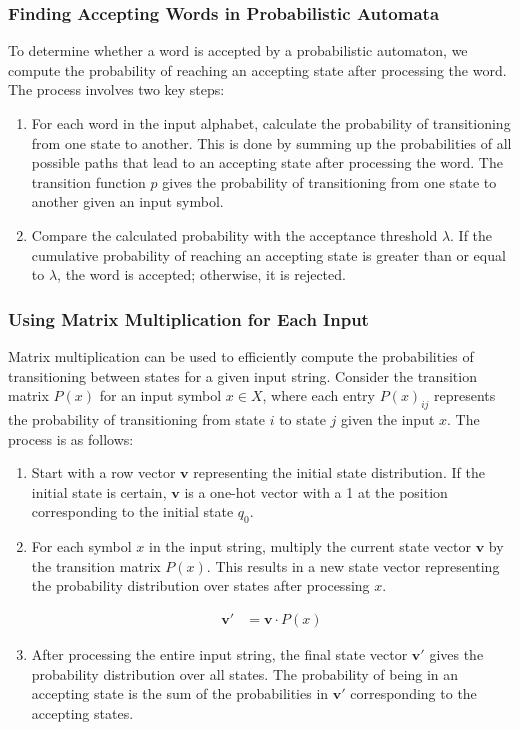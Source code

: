 \documentclass{article}
\begin{document}
\subsubsection{Finding Accepting Words in Probabilistic Automata}

To determine whether a word is accepted by a probabilistic automaton, we
compute the probability of reaching an accepting state after processing the
word. The process involves two key steps:

\begin{enumerate}
  \item   For each word in the input alphabet, calculate the probability of transitioning from one state to another. This is done by summing up the probabilities of all possible paths that lead to an accepting state after processing the word. The transition function $p$ gives the probability of transitioning from one state to another given an input symbol.

  \item   Compare the calculated probability with the acceptance threshold $\lambda$. If the cumulative probability of reaching an accepting state is greater than or equal to $\lambda$, the word is accepted; otherwise, it is rejected.

\end{enumerate}

\subsubsection{Using Matrix Multiplication for Each Input}
Matrix multiplication can be used to efficiently compute the probabilities of transitioning between states for a given input string. Consider the transition matrix $P(x)$ for an input symbol $x \in X$, where each entry $P(x)_{ij}$ represents the probability of transitioning from state $i$ to state $j$ given the input $x$. The process is as follows:

\begin{enumerate}
  \item  Start with a row vector $\mathbf{v}$ representing the initial state distribution. If the initial state is certain, $\mathbf{v}$ is a one-hot vector with a 1 at the position corresponding to the initial state $q_0$.

  \item  For each symbol $x$ in the input string, multiply the current state vector $\mathbf{v}$ by the transition matrix $P(x)$. This results in a new state vector representing the probability distribution over states after processing $x$.

  \begin{align*}
		  \mathbf{v}' &= \mathbf{v} \cdot P(x)
  \end{align*}

  \item  After processing the entire input string, the final state vector $\mathbf{v}'$ gives the probability distribution over all states. The probability of being in an accepting state is the sum of the probabilities in $\mathbf{v}'$ corresponding to the accepting states.

\end{enumerate}
\end{document}

